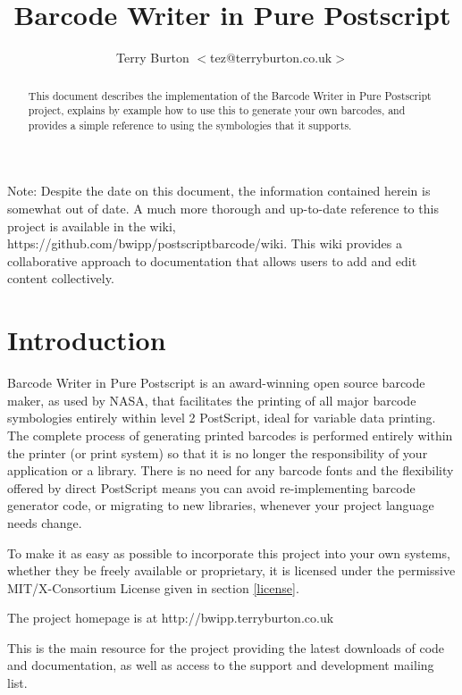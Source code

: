 \documentclass []{article}
\title{Barcode Writer in Pure Postscript}
\author{Terry Burton $<$tez@terryburton.co.uk$>$}
\begin{document}

\maketitle

\begin{abstract}
This document describes the implementation of the Barcode Writer in
Pure Postscript project, explains by example how to use this to
generate your own barcodes, and provides a simple reference to using 
the symbologies that it supports.
\end{abstract}

Note: Despite the date on this document, the information contained herein
is somewhat out of date. A much more thorough and up-to-date reference 
to this project is available in the wiki, 
\mbox{https://github.com/bwipp/postscriptbarcode/wiki}. This wiki provides
a collaborative approach to documentation that allows users to add and edit
content collectively.

\newpage

\tableofcontents

\newpage


\section{Introduction}
Barcode Writer in Pure Postscript is an award-winning open source 
barcode maker, as used by NASA, that facilitates the printing of all 
major barcode symbologies entirely within level 2 PostScript, ideal 
for variable data printing. The complete process of generating 
printed barcodes is performed entirely within the printer (or print 
system) so that it is no longer the responsibility of your 
application or a library. There is no need for any barcode fonts and 
the flexibility offered by direct PostScript means you can avoid 
re-implementing barcode generator code, or migrating to new 
libraries, whenever your project language needs change.

To make it as easy as possible to incorporate this project into 
your own systems, whether they be freely available or proprietary, 
it is licensed under the permissive
MIT/X-Consortium License given in section \ref{license}.

The project homepage is at
http://bwipp.terryburton.co.uk

This is the main resource for the project providing the latest
downloads of code and documentation, as well as access to the
support and development mailing list.
\end{document}
